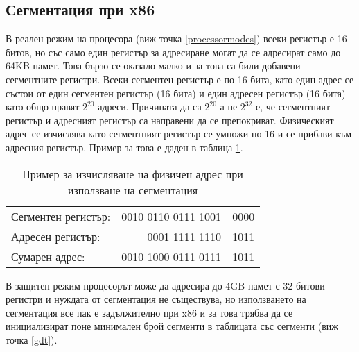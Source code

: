   \subsection{Сегментация при x86} \label{segmentation}
  В реален режим на процесора (виж точка \ref{processormodes}) всеки регистър е 16-битов, но със само един регистър за адресиране могат да се адресират само до 64KB памет. Това бързо се оказало малко и за това са били добавени сегментните регистри. Всеки сегментен регистър е по 16 бита, като един адрес се състои от един сегментен регистър (16 бита) и един адресен регистър (16 бита) като общо правят $2^{20}$ адреси. Причината да са $2^{20}$ а не $2^{32}$ е, че сегментният регистър и адресният регистър са направени да се препокриват. Физическият адрес се изчислява като сегментният регистър се умножи по 16 и се прибави към адресния регистър. Пример за това е даден в таблица \ref{tab:segmentation-calculation}.
  \begin{table}[ht]
    \centering
    \begin{tabular}{l r@{\hskip 3pt}l}
      Сегментен регистър: & 0010 0110 0111 1001 & \color{gray}0000 \\
      Адресен регистър: & 0001 1111 1110 & 1011 \\
      \hline
      Сумарен адрес: & 0010 1000 0111 0111 & 1011 \\
    \end{tabular}
    \caption{Пример за изчисляване на физичен адрес при използване на сегментация}
    \label{tab:segmentation-calculation}
  \end{table}

  В защитен режим процесорът може да адресира до 4GB памет с 32-битови регистри и нуждата от сегментация не съществува, но използването на сегментация все пак е задължително при x86 и за това трябва да се инициализират поне минимален брой сегменти в таблицата със сегменти (виж точка \ref{gdt}).



